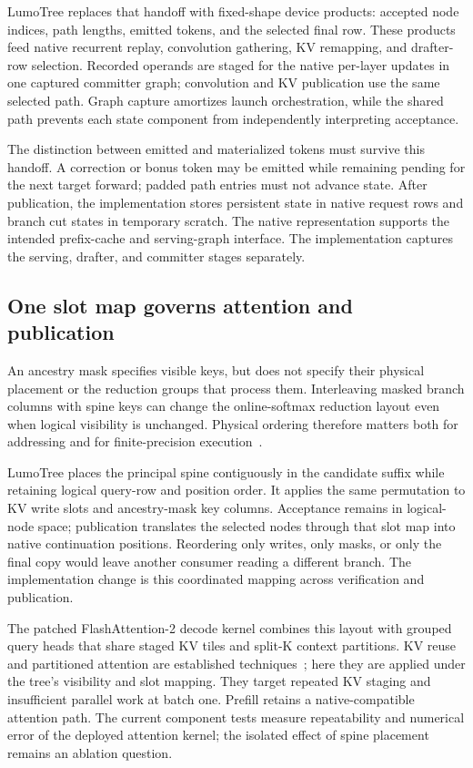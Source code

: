 \documentclass[conference]{IEEEtran}
\newcommand{\sys}{LumoTree}
\begin{document}
\sys{} replaces that handoff with fixed-shape device products: accepted node indices, path lengths, emitted tokens, and the selected final row. These products feed native recurrent replay, convolution gathering, KV remapping, and drafter-row selection. Recorded operands are staged for the native per-layer updates in one captured committer graph; convolution and KV publication use the same selected path. Graph capture amortizes launch orchestration, while the shared path prevents each state component from independently interpreting acceptance.

The distinction between emitted and materialized tokens must survive this handoff. A correction or bonus token may be emitted while remaining pending for the next target forward; padded path entries must not advance state. After publication, the implementation stores persistent state in native request rows and branch cut states in temporary scratch. The native representation supports the intended prefix-cache and serving-graph interface. The implementation captures the serving, drafter, and committer stages separately.

\subsection{One slot map governs attention and publication}
An ancestry mask specifies visible keys, but does not specify their physical placement or the reduction groups that process them. Interleaving masked branch columns with spine keys can change the online-softmax reduction layout even when logical visibility is unchanged. Physical ordering therefore matters both for addressing and for finite-precision execution~\cite{he2025determinism}.

\sys{} places the principal spine contiguously in the candidate suffix while retaining logical query-row and position order. It applies the same permutation to KV write slots and ancestry-mask key columns. Acceptance remains in logical-node space; publication translates the selected nodes through that slot map into native continuation positions. Reordering only writes, only masks, or only the final copy would leave another consumer reading a different branch. The implementation change is this coordinated mapping across verification and publication.

The patched FlashAttention-2 decode kernel combines this layout with grouped query heads that share staged KV tiles and split-K context partitions. KV reuse and partitioned attention are established techniques~\cite{yao2024deft,pan2025fasttree}; here they are applied under the tree's visibility and slot mapping. They target repeated KV staging and insufficient parallel work at batch one. Prefill retains a native-compatible attention path. The current component tests measure repeatability and numerical error of the deployed attention kernel; the isolated effect of spine placement remains an ablation question.
\end{document}

